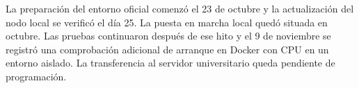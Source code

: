 La preparación del entorno oficial comenzó el 23 de octubre y la
actualización del nodo local se verificó el día 25. La puesta en marcha
local quedó situada en octubre. Las pruebas continuaron después de ese
hito y el 9 de noviembre se registró una comprobación adicional de
arranque en Docker con CPU en un entorno aislado. La transferencia
al servidor universitario queda pendiente de programación.

